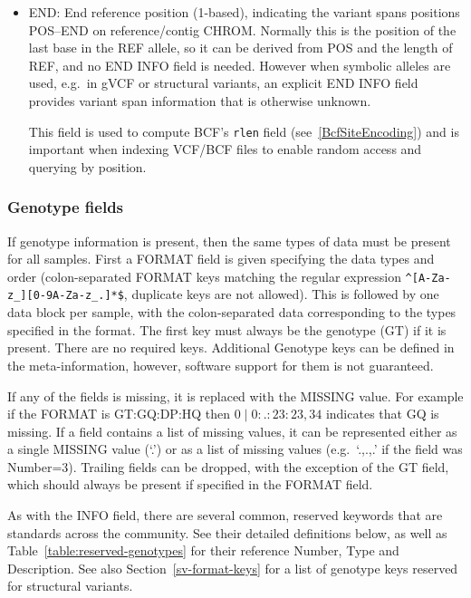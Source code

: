 \documentclass[8pt]{article}
\begin{document}
\begin{itemize}
\renewcommand{\labelitemii}{$\circ$}
\item END: End reference position (1-based), indicating the variant spans positions POS--END on reference/contig CHROM.
Normally this is the position of the last base in the REF allele, so it can be derived from POS and the length of REF, and no END INFO field is needed.
However when symbolic alleles are used, e.g.\ in gVCF or structural variants, an explicit END INFO field provides variant span information that is otherwise unknown.

This field is used to compute BCF's {\tt rlen} field (see~\ref{BcfSiteEncoding}) and is important when indexing VCF/BCF files to enable random access and querying by position.
\end{itemize}

\subsubsection{Genotype fields}
If genotype information is present, then the same types of data must be present for all samples.
First a FORMAT field is given specifying the data types and order (colon-separated FORMAT keys matching the regular expression \texttt{\^{}[A-Za-z\_][0-9A-Za-z\_.]*\$}, duplicate keys are not allowed).
This is followed by one data block per sample, with the colon-separated data corresponding to the types specified in the format.
The first key must always be the genotype (GT) if it is present.
There are no required keys.
Additional Genotype keys can be defined in the meta-information, however, software support for them is not guaranteed.

If any of the fields is missing, it is replaced with the MISSING value.
For example if the FORMAT is GT:GQ:DP:HQ then $0\mid0:.:23:23,34$ indicates that GQ is missing.
If a field contains a list of missing values, it can be represented either as a single MISSING value (`.') or as a list of missing values (e.g.\ `.,.,.' if the field was Number=3).
Trailing fields can be dropped, with the exception of the GT field, which should always be present if specified in the FORMAT field.


As with the INFO field, there are several common, reserved keywords that are standards across the community.
See their detailed definitions below, as well as Table~\ref{table:reserved-genotypes} for their reference Number, Type and Description.
See also Section~\ref{sv-format-keys} for a list of genotype keys reserved for structural variants.
\end{document}
